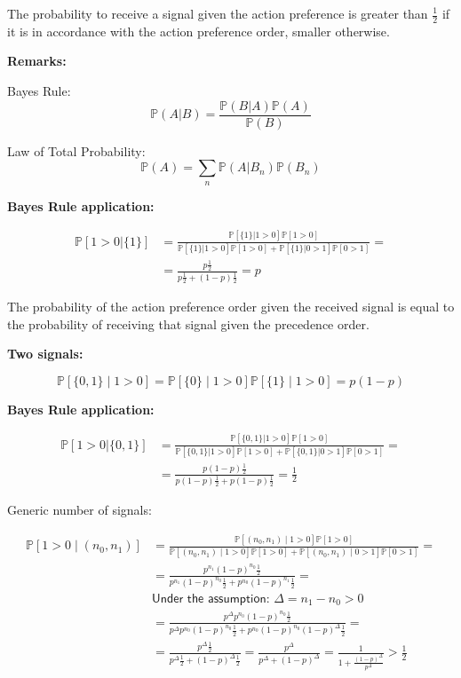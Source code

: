 \documentclass[10pt,a4paper]{article}
\begin{document}
The probability to receive a signal given the action preference is greater than $\frac{1}{2}$ if it is in accordance with the action preference order, smaller otherwise.

\textbf{Remarks:}

Bayes Rule:
$$\mathbb{P}(A|B) = \frac{\mathbb{P}(B|A)\mathbb{P}(A)}{\mathbb{P}(B)}$$

Law of Total Probability:
$$\mathbb{P}(A) = \sum_{n}{\mathbb{P}(A|B_{n})\mathbb{P}(B_{n})}$$

\textbf{Bayes Rule application:}

$$\begin{aligned}
\mathbb{P}[1>0 |\{1\}] &=\frac{\mathbb{P}[\{1\} | 1>0] \mathbb{P}[1>0]}{\mathbb{P}[\{1\} | 1>0] \mathbb{P}[1>0]+\mathbb{P}[\{1\} | 0>1] \mathbb{P}[0>1]}= \\
&=\frac{p \frac{1}{2}}{p \frac{1}{2} + (1-p) \frac{1}{2}}=p
\end{aligned}$$

The probability of the action preference order given the received signal is equal to the probability of receiving that signal given the precedence order.
\newline

\textbf{Two signals:}

$$\mathbb{P}[\{0,1\} \mid 1>0]=\mathbb{P}[\{0\} \mid 1>0] \mathbb{P}[\{1\} \mid 1>0]=p(1-p)$$
\newline

\textbf{Bayes Rule application:}

$$\begin{aligned}
\mathbb{P}[1>0 |\{0,1\}]&=\frac{\mathbb{P}[\{0,1\} | 1>0] \mathbb{P}[1>0]}{\mathbb{P}[\{0,1\} | 1>0] \mathbb{P}[1>0]+\mathbb{P}[\{0,1\}| 0>1] \mathbb{P}[0>1]}= \\
&=\frac{p(1-p) \frac{1}{2}}{p(1-p) \frac{1}{2}+p(1-p) \frac{1}{2}}=\frac{1}{2}
\end{aligned}$$

Generic number of signals:

$$\begin{aligned}
\mathbb{P}\left[1>0 \mid\left(n_{0}, n_{1}\right)\right] &=\frac{\mathbb{P}\left[\left(n_{0}, n_{1}\right) \mid 1>0\right] \mathbb{P}[1>0]}{\mathbb{P}\left[\left(n_{0}, n_{1}\right) \mid 1>0\right] \mathbb{P}[1>0]+\mathbb{P}\left[\left(n_{0}, n_{1}\right) \mid 0>1\right] \mathbb{P}[0>1]}= \\
&=\frac{p^{n_{1}}(1-p)^{n_{0}} \frac{1}{2}}{p^{n_{1}}(1-p)^{n_{0}} \frac{1}{2}+p^{n_{0}}(1-p)^{n_{1}} \frac{1}{2}}= \\
&\textsf{Under the assumption: } \Delta=n_{1}-n_{0}>0 \\ &=\frac{p^{\Delta}p^{n_{0}}(1-p)^{n_{0}} \frac{1}{2}}{p^{\Delta}p^{n_{0}}(1-p)^{n_{0}} \frac{1}{2}+p^{n_{0}}(1-p)^{n_{0}}(1-p)^{\Delta} \frac{1}{2}}= \\
&=\frac{p^{\Delta} \frac{1}{2}}{p^{\Delta} \frac{1}{2}+(1-p)^{\Delta} \frac{1}{2}}=\frac{p^{\Delta}}{p^{\Delta}+(1-p)^{\Delta}}=\frac{1}{1+\frac{(1-p)^{\Delta}}{p^{\Delta}}}>\frac{1}{2}
\end{aligned}$$
\end{document}
